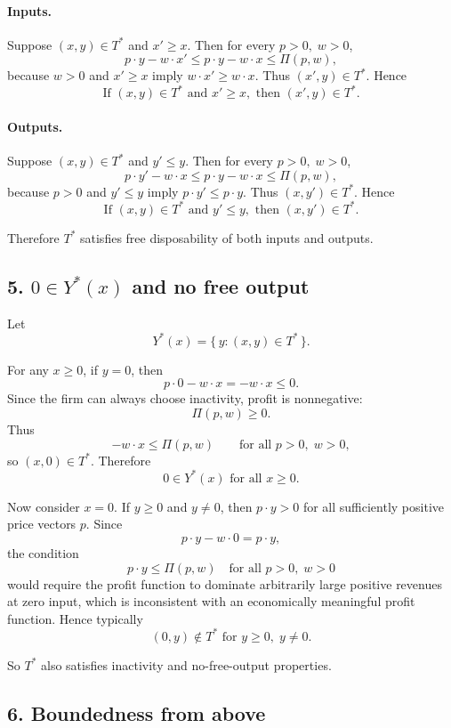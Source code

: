 \paragraph{Inputs.}
Suppose \((x,y)\in T^*\) and \(x'\ge x\). Then for every \(p>0,\;w>0\),
\[
p\cdot y-w\cdot x'
\le
p\cdot y-w\cdot x
\le
\Pi(p,w),
\]
because \(w>0\) and \(x'\ge x\) imply \(w\cdot x'\ge w\cdot x\). Thus \((x',y)\in T^*\). Hence
\[
\boxed{\text{If } (x,y)\in T^* \text{ and } x'\ge x,\text{ then } (x',y)\in T^*.}
\]

\paragraph{Outputs.}
Suppose \((x,y)\in T^*\) and \(y'\le y\). Then for every \(p>0,\;w>0\),
\[
p\cdot y'-w\cdot x
\le
p\cdot y-w\cdot x
\le
\Pi(p,w),
\]
because \(p>0\) and \(y'\le y\) imply \(p\cdot y'\le p\cdot y\). Thus \((x,y')\in T^*\). Hence
\[
\boxed{\text{If } (x,y)\in T^* \text{ and } y'\le y,\text{ then } (x,y')\in T^*.}
\]

Therefore \(T^*\) satisfies free disposability of both inputs and outputs.

\subsection*{5. \(0\in Y^*(x)\) and no free output}

Let
\[
Y^*(x)=\{\,y:(x,y)\in T^*\,\}.
\]

For any \(x\ge 0\), if \(y=0\), then
\[
p\cdot 0-w\cdot x=-w\cdot x\le 0.
\]
Since the firm can always choose inactivity, profit is nonnegative:
\[
\Pi(p,w)\ge 0.
\]
Thus
\[
-w\cdot x\le \Pi(p,w)
\qquad \text{for all } p>0,\; w>0,
\]
so \((x,0)\in T^*\). Therefore
\[
\boxed{0\in Y^*(x)\text{ for all }x\ge 0.}
\]

Now consider \(x=0\). If \(y\ge 0\) and \(y\neq 0\), then \(p\cdot y>0\) for all sufficiently positive price vectors \(p\). Since
\[
p\cdot y-w\cdot 0=p\cdot y,
\]
the condition
\[
p\cdot y\le \Pi(p,w)
\quad \text{for all } p>0,\;w>0
\]
would require the profit function to dominate arbitrarily large positive revenues at zero input, which is inconsistent with an economically meaningful profit function. Hence typically
\[
\boxed{(0,y)\notin T^* \text{ for } y\ge 0,\; y\neq 0.}
\]

So \(T^*\) also satisfies inactivity and no-free-output properties.

\subsection*{6. Boundedness from above}

